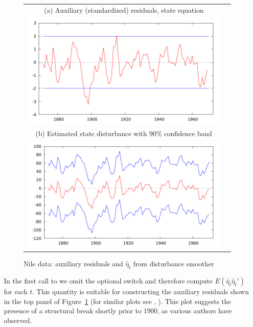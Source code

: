 \begin{figure}[htbp]
  \centering
  \begin{tabular}{cc}
  \small
  (a) Auxiliary (standardized) residuals, state equation \\
    \includegraphics{figures/nile_eta_ksd} \\[14pt]
  \small (b) Estimated state disturbance with 90\% confidence band \\
  \includegraphics{figures/nile_eta_dk}
  \end{tabular}
  \caption{Nile data: auxiliary residuals and $\hat{\eta}_t$
    from disturbance smoother}
  \label{fig:nile}
\end{figure}

In the first call to  we omit the optional switch and
therefore compute $E(\hat{\eta}_t\hat{\eta}_t')$ for each $t$. This
quantity is suitable for constructing the auxiliary residuals shown in
the top panel of Figure~\ref{fig:nile} (for similar plots see
\cite{koopman-etal99}, \cite{pelagatti11}).  This plot suggests the
presence of a structural break shortly prior to 1900, as various
authors have observed.

